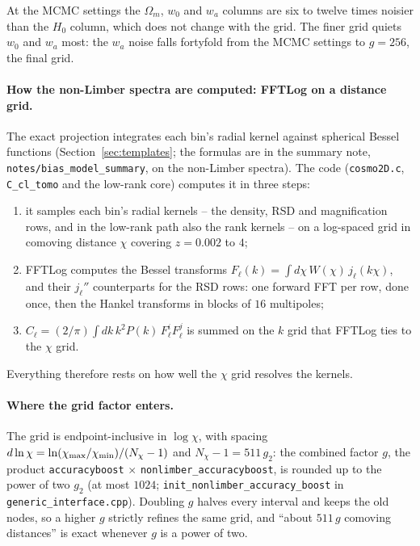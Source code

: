 \documentclass[11pt]{article}
\newcommand{\us}{\_\allowbreak}
\begin{document}
At the MCMC settings the $\Omega_m$, $w_0$ and $w_a$ columns are six
to twelve times noisier than the $H_0$ column, which does not change
with the grid.  The finer grid quiets $w_0$ and $w_a$ most: the $w_a$
noise falls fortyfold from the MCMC settings to $g = 256$, the final
grid.

\paragraph{How the non-Limber spectra are computed: FFTLog on a
distance grid.}
The exact projection integrates each bin's radial kernel against
spherical Bessel functions (Section~\ref{sec:templates}; the formulas
are in the summary note, \texttt{notes/bias\us model\us summary}, on
the non-Limber spectra).  The code
(\texttt{cosmo2D.c}, \texttt{C\us cl\us tomo} and the low-rank core)
computes it in three steps:
\begin{enumerate}
  \item it samples each bin's radial kernels -- the density, RSD and
    magnification rows, and in the low-rank path also the rank
    kernels -- on a log-spaced grid in comoving distance $\chi$
    covering $z = 0.002$ to $4$;
  \item FFTLog computes the Bessel transforms
    $F_\ell(k) = \int d\chi\, W(\chi)\, j_\ell(k\chi)$, and their
    $j_\ell''$ counterparts for the RSD rows: one forward FFT per row,
    done once, then the Hankel transforms in blocks of $16$
    multipoles;
  \item $C_\ell = (2/\pi)\int dk\, k^2 P(k)\, F^i_\ell F^j_\ell$ is
    summed on the $k$ grid that FFTLog ties to the $\chi$ grid.
\end{enumerate}
Everything therefore rests on how well the $\chi$ grid resolves the
kernels.

\paragraph{Where the grid factor enters.}
The grid is endpoint-inclusive in $\log\chi$, with spacing
$d\ln\chi = \ln(\chi_{\rm max}/\chi_{\rm min})/(N_\chi - 1)$ and
$N_\chi - 1 = 511\,g_2$: the combined factor $g$, the product
\texttt{accuracyboost} $\times$ \texttt{nonlimber\us accuracyboost},
is rounded up to the power of two
$g_2$ (at most $1024$; \texttt{init\us nonlimber\us accuracy\us boost}
in \texttt{generic\us interface.cpp}).  Doubling $g$ halves every
interval and keeps the old nodes, so a higher $g$ strictly refines the
same grid, and ``about $511\,g$ comoving distances'' is exact whenever
$g$ is a power of two.
\end{document}
